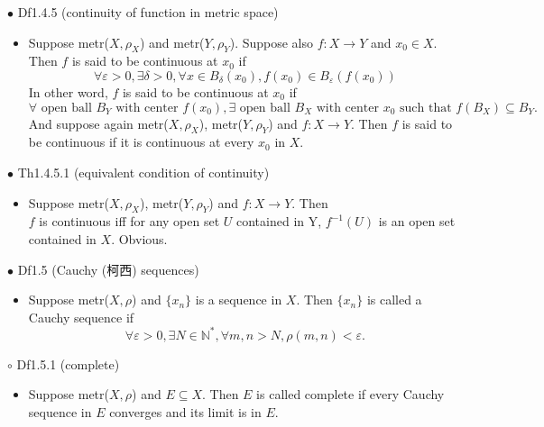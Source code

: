\documentclass{article}
\begin{document}
{\Large $\bullet $ Df1.4.5 (continuity of function in metric space)}\par
\begin{itemize}
    \item[]
    {\large Suppose metr($X, \rho_X$) and metr($Y, \rho_Y$). Suppose also $f:X\rightarrow Y$ and $x_0\in X$.
    Then $f$ is said to be continuous at $x_0$ if 
    $$\forall \varepsilon>0, \exists \delta>0, \forall x\in B_{\delta}(x_0), f(x_0)\in B_{\varepsilon}(f(x_0))$$}
    {\textcolor{pf}{In other word, $f$ is said to be continuous at $x_0$ if
    $$\forall \text{ open ball } B_Y \text{ with center } f(x_0),\exists \text{ open ball } B_X 
    \text{ with center } x_0 \text{ such that } f(B_X)\subseteq B_Y.$$}}
    {\large And suppose again metr($X, \rho_X$), metr($Y, \rho_Y$) and $f:X\rightarrow Y$. 
    Then $f$ is said to be continuous if it is continuous at every $x_0$ in $X$.}
\end{itemize}\par
\quad

{\Large $\bullet $ Th1.4.5.1 (equivalent condition of continuity)}\par
\begin{itemize}
    \item[]
    {\large Suppose metr($X, \rho_X$), metr($Y, \rho_Y$) and $f:X\rightarrow Y$. Then\\
        $f$ is continuous iff for any open set $U$ contained in Y,
        $f^{-1}(U)$ is an open set contained in $X$.}
    {\textcolor{pf}{Obvious.}}
\end{itemize}\par
\quad

{\Large $\bullet $ Df1.5 (Cauchy (柯西) sequences)}\par
\begin{itemize}
    \item[]
    {\large Suppose metr($X, \rho$) and $\{x_n\}$ is a sequence in $X$. 
    Then $\{x_n\}$ is called a Cauchy sequence if
    $$\forall \varepsilon>0, \exists N\in \mathbb{N}^{\ast}, \forall m,n>N, \rho(m, n)<\varepsilon.$$}
\end{itemize}\par
\quad

{\Large $\circ $ Df1.5.1 (complete)}\par
\begin{itemize}
    \item[]
    {\large Suppose metr($X, \rho$) and $E\subseteq X$. 
    Then $E$ is called complete if every Cauchy sequence in $E$ 
    converges and its limit is in $E$.}
\end{itemize}\par
\quad
\end{document}
